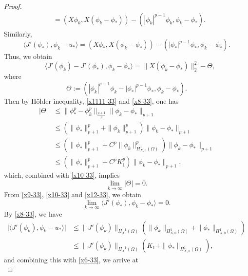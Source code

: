 \documentclass[10pt,a4paper]{amsart}
\begin{document}
\begin{proof}
\begin{equation*}
\begin{split}
&=\left(X\phi_k,X(\phi_k-\phi_*)\right)-\left(|\phi_k|^{p-1}\phi_k,\phi_k-\phi_*\right).
\end{split}
\end{equation*}
Similarly,
\begin{equation}\label{x12-33}
\langle J'(\phi_*),\phi_k-u_*\rangle=(X\phi_*,X(\phi_k-\phi_*))-\left(|\phi_*|^{p-1}\phi_*,\phi_k-\phi_*\right).
\end{equation}
Thus, we obtain
\begin{equation}\label{x16-33}
\quad \langle J'(\phi_k)-J'(\phi_*),\phi_k-\phi_*\rangle=\|X(\phi_k-\phi_*)\|_2^2-\Theta,
\end{equation}
where $$\Theta:=\left(|\phi_k|^{p-1}\phi_k-|\phi_*|^{p-1}\phi_*,\phi_k-\phi_*\right).$$
Then by H\"{o}lder inequality, \eqref{x1111-33} and \eqref{x8-33}, one has
\begin{equation*}
\begin{split}
|\Theta|&\leq\|\phi_*^p-\phi_k^p\|_{\frac{p+1}{p}}\|\phi_k-\phi_*\|_{p+1}\\
&\leq\left(\|\phi_*\|_{p+1}^p+\|\phi_k\|_{p+1}^p\right)\|\phi_k-\phi_*\|_{p+1}\\
&\leq\left(\|\phi_*\|_{p+1}^p+C^p\|\phi_k\|_{H_{X,0}^1(\Omega)}^p\right)\|\phi_k-\phi_*\|_{p+1}\\
&\leq\left(\|\phi_*\|_{p+1}^p+C^pK_1^p\right)\|\phi_k-\phi_*\|_{p+1},
\end{split}
\end{equation*}
which, combined with \eqref{x10-33}, implies
\begin{equation}\label{x11-33}
\lim_{k\rightarrow\infty}|\Theta|=0.
\end{equation}
From \eqref{x9-33}, \eqref{x10-33} and \eqref{x12-33}, we obtain
\begin{equation}\label{x13-33}
\lim_{k\rightarrow\infty}\langle J'(\phi_*),\phi_k-\phi_*\rangle=0.
\end{equation}
By \eqref{x8-33}, we have
\begin{equation*}
\begin{split}
\big|\langle J'(\phi_k),\phi_k-u_*\rangle\big|&\leq\|J'(\phi_k)\|_{H_X^{-1}(\Omega)}\left(\|\phi_k\|_{H_{X,0}^1(\Omega)}+\|\phi_*\|_{H_{X,0}^1(\Omega)}\right)\\
&\leq\|J'(\phi_k)\|_{H_X^{-1}(\Omega)}\left(K_1+\|\phi_*\|_{H_{X,0}^1(\Omega)}\right),
\end{split}
\end{equation*}
and combining this with \eqref{x6-33}, we arrive at
\begin{equation}\label{x15-33}

\end{equation}
\end{proof}
\end{document}
